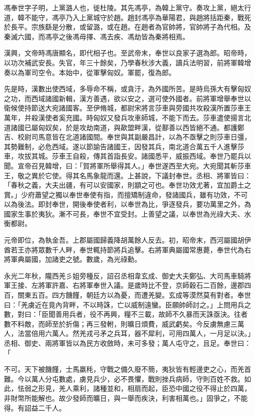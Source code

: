 
\begin{pinyinscope}
馮奉世字子明，上黨潞人也，徙杜陵。其先馮亭，為韓上黨守。奏攻上黨，絕太行道，韓不能守，馮亭乃入上黨城守於趙。趙封馮亭為華陽君，與趙將括距秦，戰死於長平。宗族繇是分散，或留潞，或在趙。在趙者為官帥將，官帥將子為代相。及秦滅六國，而馮亭之後馮毋擇、馮去疾、馮劫皆為秦將相焉。

漢興，文帝時馮唐顯名，即代相子也。至武帝末，奉世以良家子選為郎。昭帝時，以功次補武安長。失官，年三十餘矣，乃學春秋涉大義，讀兵法明習，前將軍韓增奏以為軍司空令。本始中，從軍擊匈奴。軍罷，復為郎。

先是時，漢數出使西域，多辱命不稱，或貪汙，為外國所苦。是時烏孫大有擊匈奴之功，而西域諸國新輯，漢方善遇，欲以安之，選可使外國者。前將軍增舉奉世以衛候使持節送大宛諸國客。至伊脩城，都尉宋將言莎車與旁國共攻殺漢所置莎車王萬年，并殺漢使者奚充國。時匈奴又發兵攻車師城，不能下而去。莎車遣使揚言北道諸國已屬匈奴矣，於是攻劫南道，與歃盟畔漢，從鄯善以西皆絕不通。都護鄭吉、校尉司馬意皆在北道諸國間。奉世與其副嚴昌計，以為不亟擊之則莎車日彊，其勢難制，必危西域。遂以節諭告諸國王，因發其兵，南北道合萬五千人進擊莎車，攻拔其城。莎車王自殺，傳其首詣長安。諸國悉平，威振西域。奉世乃罷兵以聞。宣帝召見韓增，曰：「賀將軍所舉得其人。」奉世遂西至大宛。大宛聞其斬莎車王，敬之異於它使。得其名馬象龍而還。上甚說，下議封奉世。丞相、將軍皆曰：「春秋之義，大夫出疆，有可以安國家，則顓之可也。奉世功效尤著，宜加爵土之賞。」少府蕭望之獨以奉世奉使有指，而擅矯制違命，發諸國兵，雖有功效，不可以為後法。即封奉世，開後奉使者利，以奉世為比，爭逐發兵，要功萬里之外，為國家生事於夷狄。漸不可長，奉世不宜受封。上善望之議，以奉世為光祿大夫、水衡都尉。

元帝即位，為執金吾。上郡屬國歸義降胡萬餘人反去。初，昭帝末，西河屬國胡伊酋若王亦將眾數千人畔，奉世輒持節將兵追擊。右將軍典屬國常惠薨，奉世代為右將軍典屬國，加諸吏之號。數歲，為光祿勳。

永光二年秋，隴西羌彡姐旁種反，詔召丞相韋玄成、御史大夫鄭弘、大司馬車騎將軍王接、左將軍許嘉、右將軍奉世入議。是歲時比不登，京師穀石二百餘，邊郡四百，關東五百。四方饑饉，朝廷方以為憂，而遭羌變。玄成等漠然莫有對者。奉世曰：「羌虜近在竟內背畔，不以時誅，亡以威制遠蠻。臣願帥師討之。」上問用兵之數，對曰：「臣聞善用兵者，役不再興，糧不三載，故師不久暴而天誅亟決。往者數不料敵，而師至於折傷；再三發軵，則曠日煩費，威武虧矣。今反虜無慮三萬人，法當倍用六萬人。然羌戎弓矛之兵耳，器不犀利，可用四萬人，一月足以決。」丞相、御史、兩將軍皆以為民方收斂時，未可多發；萬人屯守之，且足。奉世曰：「

不可。天下被饑饉，士馬羸秏，守戰之備久廢不簡，夷狄皆有輕邊吏之心，而羌首難。今以萬人分屯數處，虜見兵少，必不畏懼，戰則挫兵病師，守則百姓不救。如此，怯弱之形見，羌人乘利，諸種並和，相扇而起，臣恐中國之役不得止於四萬，非財幣所能解也。故少發師而曠日，與一舉而疾決，利害相萬也。」固爭之，不能得。有詔益二千人。


\end{pinyinscope}
